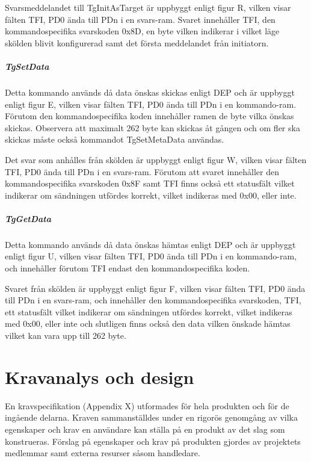 \documentclass[11pt]{article}
\begin{document}
Svarsmeddelandet till TgInitAsTarget är uppbyggt enligt figur R, vilken visar fälten TFI, PD0 ända till PDn i en svars-ram. Svaret innehåller TFI, den kommandospecifika svarskoden 0x8D, en byte vilken indikerar i vilket läge skölden blivit konfigurerad samt det första meddelandet från initiatorn.


\subparagraph{TgSetData}
Detta kommando används då data önskas skickas enligt DEP och är uppbyggt enligt figur E, vilken visar fälten TFI, PD0 ända till PDn i en kommando-ram. Förutom den kommandospecifika koden innehåller ramen de byte vilka önskas skickas. Observera att maximalt 262 byte kan skickas åt gången och om fler ska skickas måste också kommandot TgSetMetaData användas.


Det svar som anhålles från skölden är uppbyggt enligt figur W, vilken visar fälten TFI, PD0 ända till PDn i en svars-ram. Förutom att svaret innehåller den kommandospecifika svarskoden 0x8F samt TFI finns också ett statusfält vilket indikerar om sändningen utfördes korrekt, vilket indikeras med 0x00, eller inte.


\subparagraph{TgGetData}
Detta kommando används då data önskas hämtas enligt DEP och är uppbyggt enligt figur U, vilken visar fälten TFI, PD0 ända till PDn i en kommando-ram, och innehåller förutom TFI endast den kommandospecifika koden.


Svaret från skölden är uppbyggt enligt figur F, vilken visar fälten TFI, PD0 ända till PDn i en svars-ram, och innehåller den kommandospecifika svarskoden, TFI, ett statusfält vilket indikerar om sändningen utfördes korrekt, vilket indikeras med 0x00, eller inte och slutligen finns också den data vilken önskade hämtas vilket kan vara upp till 262 byte.


\section{Kravanalys och design}
En kravspecifikation (Appendix X) utformades för hela produkten och för de ingående delarna. Kraven sammanställdes under en rigorös genomgång av vilka egenskaper och krav en användare kan ställa på en produkt av det slag som konstrueras. Förslag på egenskaper och krav på produkten gjordes av projektets medlemmar samt externa resurser såsom handledare.
\end{document}
